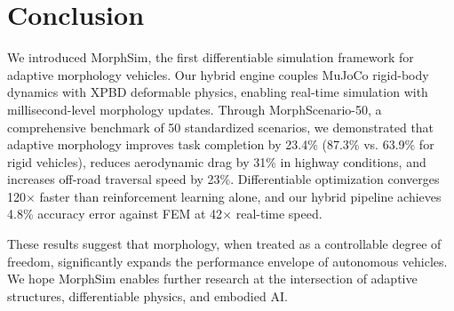 \section{Conclusion}

We introduced MorphSim, the first differentiable simulation framework for adaptive morphology vehicles. Our hybrid engine couples MuJoCo rigid-body dynamics with XPBD deformable physics, enabling real-time simulation with millisecond-level morphology updates. Through MorphScenario-50, a comprehensive benchmark of 50 standardized scenarios, we demonstrated that adaptive morphology improves task completion by 23.4\% (87.3\% vs. 63.9\% for rigid vehicles), reduces aerodynamic drag by 31\% in highway conditions, and increases off-road traversal speed by 23\%. Differentiable optimization converges 120$\times$ faster than reinforcement learning alone, and our hybrid pipeline achieves 4.8\% accuracy error against FEM at 42$\times$ real-time speed.

These results suggest that morphology, when treated as a controllable degree of freedom, significantly expands the performance envelope of autonomous vehicles. We hope MorphSim enables further research at the intersection of adaptive structures, differentiable physics, and embodied AI.